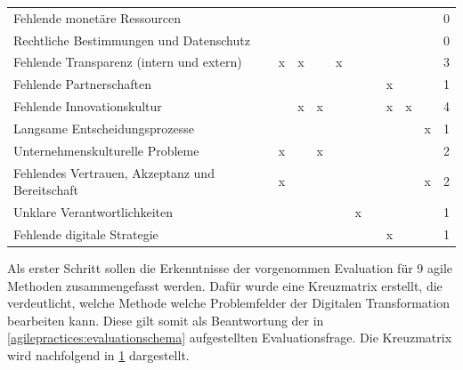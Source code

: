 \begin{table}
\begin{tabular}{|p{7cm}|c|c|c|c|c|c|c|c|c|c|}
		Fehlende monetäre Ressourcen                    &       &                 &        &        &    &      &                        &     &                   & 0 \\
		Rechtliche Bestimmungen und Datenschutz         &       &                 &        &        &    &      &                        &     &                   & 0 \\
		Fehlende Transparenz (intern und extern)        & x     & x               &        & x      &    &      &                        &     &                   & 3 \\
		Fehlende Partnerschaften                        &       &                 &        &        &    &      & x                      &     &                   & 1 \\
		Fehlende Innovationskultur                      &       & x               & x      &        &    &      & x                      & x   &                   & 4 \\
		Langsame Entscheidungsprozesse                  &       &                 &        &        &    &      &                        &     & x                 & 1 \\
		Unternehmenskulturelle Probleme                 & x     &                 & x      &        &    &      &                        &     &                   & 2 \\
		Fehlendes Vertrauen, Akzeptanz und Bereitschaft & x     &                 &        &        &    &      &                        &     & x                 & 2 \\
		Unklare Verantwortlichkeiten                    &       &                 &        &        & x  &      &                        &     &                   & 1 \\
		Fehlende digitale Strategie                     &       &                 &        &        &    &      & x                      &     &                   & 1 \\
		\hline
	\end{tabular}
	\label{tab:clusteringfinal}
\end{table}

Als erster Schritt sollen die Erkenntnisse der vorgenommen Evaluation für 9 agile Methoden zusammengefasst werden. Dafür wurde eine Kreuzmatrix erstellt, die verdeutlicht, welche Methode welche Problemfelder der  Digitalen Transformation bearbeiten kann. Diese gilt somit als Beantwortung der in \ref{agilepractices:evaluationschema} aufgestellten Evaluationsfrage. Die Kreuzmatrix wird nachfolgend in \ref{tab:clusteringfinal} dargestellt.

